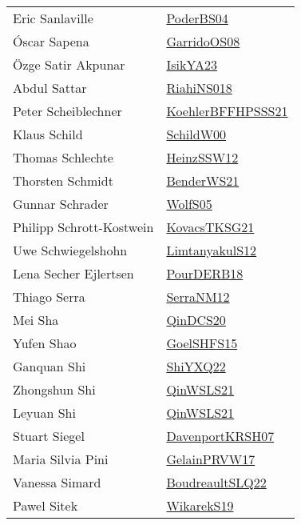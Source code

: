 {\begin{longtable}{p{4cm}p{20cm}}
Eric Sanlaville & \href{articles/PoderBS04.pdf}{PoderBS04}\cite{PoderBS04} \\
{\'{O}}scar Sapena & \href{articles/GarridoOS08.pdf}{GarridoOS08}\cite{GarridoOS08} \\
{\"{O}}zge Satir Akpunar & \href{articles/IsikYA23.pdf}{IsikYA23}\cite{IsikYA23} \\
Abdul Sattar & \href{papers/RiahiNS018.pdf}{RiahiNS018}\cite{RiahiNS018} \\
Peter Scheiblechner & \href{articles/KoehlerBFFHPSSS21.pdf}{KoehlerBFFHPSSS21}\cite{KoehlerBFFHPSSS21} \\
Klaus Schild & \href{articles/SchildW00.pdf}{SchildW00}\cite{SchildW00} \\
Thomas Schlechte & \href{articles/HeinzSSW12.pdf}{HeinzSSW12}\cite{HeinzSSW12} \\
Thorsten Schmidt & \href{papers/BenderWS21.pdf}{BenderWS21}\cite{BenderWS21} \\
Gunnar Schrader & \href{papers/WolfS05.pdf}{WolfS05}\cite{WolfS05} \\
Philipp Schrott{-}Kostwein & \href{papers/KovacsTKSG21.pdf}{KovacsTKSG21}\cite{KovacsTKSG21} \\
Uwe Schwiegelshohn & \href{articles/LimtanyakulS12.pdf}{LimtanyakulS12}\cite{LimtanyakulS12} \\
Lena Secher Ejlertsen & \href{articles/PourDERB18.pdf}{PourDERB18}\cite{PourDERB18} \\
Thiago Serra & \href{papers/SerraNM12.pdf}{SerraNM12}\cite{SerraNM12} \\
Mei Sha & \href{articles/QinDCS20.pdf}{QinDCS20}\cite{QinDCS20} \\
Yufen Shao & \href{articles/GoelSHFS15.pdf}{GoelSHFS15}\cite{GoelSHFS15} \\
Ganquan Shi & \href{}{ShiYXQ22}\cite{ShiYXQ22} \\
Zhongshun Shi & \href{articles/QinWSLS21.pdf}{QinWSLS21}\cite{QinWSLS21} \\
Leyuan Shi & \href{articles/QinWSLS21.pdf}{QinWSLS21}\cite{QinWSLS21} \\
Stuart Siegel & \href{papers/DavenportKRSH07.pdf}{DavenportKRSH07}\cite{DavenportKRSH07} \\
Maria Silvia Pini & \href{papers/GelainPRVW17.pdf}{GelainPRVW17}\cite{GelainPRVW17} \\
Vanessa Simard & \href{papers/BoudreaultSLQ22.pdf}{BoudreaultSLQ22}\cite{BoudreaultSLQ22} \\
Pawel Sitek & \href{articles/WikarekS19.pdf}{WikarekS19}\cite{WikarekS19} \\

\end{longtable}}
